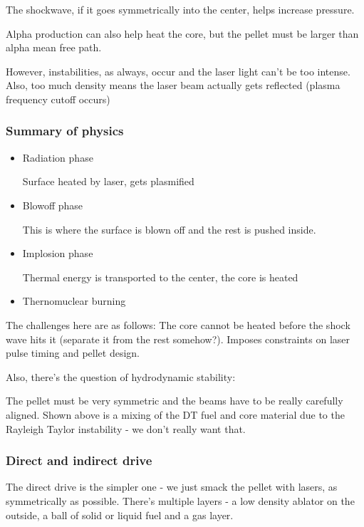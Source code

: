 \documentclass[PlasmaNotes.tex]{subfiles}
\begin{document}
The shockwave, if it goes symmetrically into the center, helps increase pressure.

Alpha production can also help heat the core, but the pellet must be larger than alpha mean free path.

However, instabilities, as always, occur and the laser light can't be too intense. Also, too much density means the laser beam actually gets reflected (plasma frequency cutoff occurs)

\subsubsection{Summary of physics}

\begin{itemize}
 \item Radiation phase
 
 Surface heated by laser, gets plasmified
 \item Blowoff phase
 
 This is where the surface is blown off and the rest is pushed inside.
 
 \item Implosion phase
 
 Thermal energy is transported to the center, the core is heated
 
 \item Thernomuclear burning
 
\end{itemize}

The challenges here are as follows: The core cannot be heated before the shock wave hits it (separate it from the rest somehow?). Imposes constraints on laser pulse timing and pellet design.

Also, there's the question of hydrodynamic stability:


The pellet must be very symmetric and the beams have to be really carefully aligned. Shown above is a mixing of the DT fuel and core material due to the Rayleigh Taylor instability - we don't really want that.

\subsubsection{Direct and indirect drive}

The direct drive is the simpler one - we just smack the pellet with lasers, as symmetrically as possible. There's multiple layers - a low density ablator on the outside, a ball of solid or liquid fuel and a gas layer.
\end{document}
